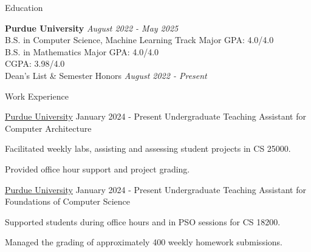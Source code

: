 \documentclass[
    11pt, %
]{resume} %
\begin{document}

\small
\begin{rSection}{Education}

    \textbf{Purdue University} \hfill \textit{August 2022 - May 2025} \\ 
    B.S. in Computer Science, Machine Learning Track \hfill Major GPA: 4.0/4.0 \\
    B.S. in Mathematics \hfill Major GPA: 4.0/4.0 \\
    \hspace*{\fill}  CGPA: 3.98/4.0 \\
    Dean's List \& Semester Honors \hfill {\em August 2022 - Present} 
    
\end{rSection}
\vspace*{-0.5cm}
\begin{rSection}{Work Experience}
    \begin{rSubsection}
        {\href{https://www.cs.purdue.edu/academic-programs/courses/canonical/cs250.html}
        {Purdue University}}
        {January 2024 - Present}
        {Undergraduate Teaching Assistant for Computer Architecture}{}

        \item Facilitated weekly labs, assisting and assessing student projects in CS 25000.
        \item Provided office hour support and project grading.
    \end{rSubsection}

    \begin{rSubsection}
        {\href{https://www.cs.purdue.edu/academic-programs/courses/canonical/cs182.html}
        {Purdue University}}
        {January 2024 - Present}
        {Undergraduate Teaching Assistant for Foundations of Computer Science}{}

        \item Supported students during office hours and in PSO sessions for CS 18200.
        \item Managed the grading of approximately 400 weekly homework submissions.
    \end{rSubsection}
\end{rSection}
\end{document}
